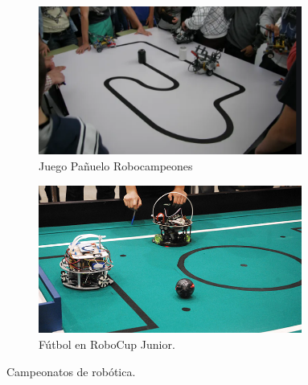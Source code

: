 \begin{itemize}
    \begin{figure}[H]
  \begin{subfigure}[b]{0.5\textwidth}
  \centering
    \includegraphics[width=0.95\textwidth, height=0.7\textwidth]{chapters/images/robocam.png}
    \caption{Juego Pañuelo Robocampeones}
    \label{fig:f1}
  \end{subfigure}
  \hfill
  \begin{subfigure}[b]{0.5\textwidth}
  \centering
    \includegraphics[width=0.95\textwidth, height=0.7\textwidth]{chapters/images/robocup.jpeg}
    \caption{Fútbol en RoboCup Junior.}
    \label{fig:f2}
  \end{subfigure}
  \caption{Campeonatos de robótica.}
\end{figure}
\end{itemize}

